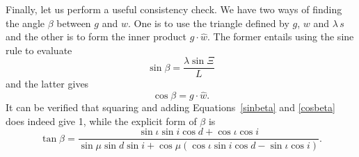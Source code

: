 \documentclass[12pt]{article}
\newcommand{\dt}{\! \cdot \!}
\newcommand{\what}{\hat{w}}
\begin{document}
%
Finally, let us perform a useful consistency check. We have two ways of finding the angle $\beta$ between $g$ and $w$. One is to use the triangle defined by $g$, $w$ and $\lambda\,s$ and the other is to form the inner product $g \dt \what$. The former entails using the sine rule to evaluate
%
\begin{equation} \label{sinbeta}
\sin\beta = \frac{\lambda\sin\Xi}{L}
\end{equation}
%
and the latter gives
%
\begin{equation}\label{cosbeta}
\cos\beta = g \dt \what.
\end{equation}
%
It can be verified that squaring and adding Equations~\ref{sinbeta} and \ref{cosbeta} does indeed give 1, while the explicit form of $\beta$ is
%
\begin{equation} \label{tanbeta}
\tan\beta = \frac{\sin\iota\sin i\cos d + \cos\iota\cos i}
{\sin\mu \sin d \sin i + \cos\mu( \cos\iota\sin i\cos d - \sin\iota\cos i )}.
\end{equation}
%
\end{document}
